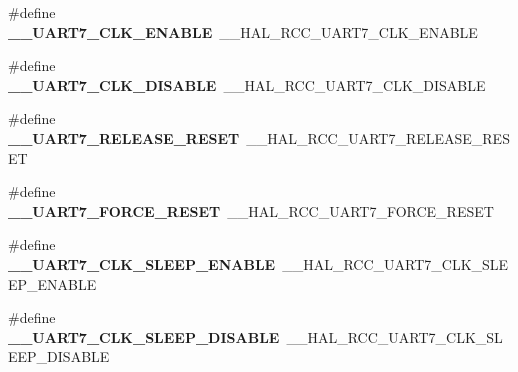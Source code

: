 \begin{DoxyCompactItemize}
\item 
\#define {\bfseries \+\_\+\+\_\+\+U\+A\+R\+T7\+\_\+\+C\+L\+K\+\_\+\+E\+N\+A\+B\+LE}~\+\_\+\+\_\+\+H\+A\+L\+\_\+\+R\+C\+C\+\_\+\+U\+A\+R\+T7\+\_\+\+C\+L\+K\+\_\+\+E\+N\+A\+B\+LE\hypertarget{group___h_a_l___r_c_c___aliased_ga7bb431add3abe23b0fdc920d818b478a}{}\label{group___h_a_l___r_c_c___aliased_ga7bb431add3abe23b0fdc920d818b478a}

\item 
\#define {\bfseries \+\_\+\+\_\+\+U\+A\+R\+T7\+\_\+\+C\+L\+K\+\_\+\+D\+I\+S\+A\+B\+LE}~\+\_\+\+\_\+\+H\+A\+L\+\_\+\+R\+C\+C\+\_\+\+U\+A\+R\+T7\+\_\+\+C\+L\+K\+\_\+\+D\+I\+S\+A\+B\+LE\hypertarget{group___h_a_l___r_c_c___aliased_gac296bb1fe20a4be61a6572c11021d61d}{}\label{group___h_a_l___r_c_c___aliased_gac296bb1fe20a4be61a6572c11021d61d}

\item 
\#define {\bfseries \+\_\+\+\_\+\+U\+A\+R\+T7\+\_\+\+R\+E\+L\+E\+A\+S\+E\+\_\+\+R\+E\+S\+ET}~\+\_\+\+\_\+\+H\+A\+L\+\_\+\+R\+C\+C\+\_\+\+U\+A\+R\+T7\+\_\+\+R\+E\+L\+E\+A\+S\+E\+\_\+\+R\+E\+S\+ET\hypertarget{group___h_a_l___r_c_c___aliased_ga5ba5a490c4e274abe50505d7458ee505}{}\label{group___h_a_l___r_c_c___aliased_ga5ba5a490c4e274abe50505d7458ee505}

\item 
\#define {\bfseries \+\_\+\+\_\+\+U\+A\+R\+T7\+\_\+\+F\+O\+R\+C\+E\+\_\+\+R\+E\+S\+ET}~\+\_\+\+\_\+\+H\+A\+L\+\_\+\+R\+C\+C\+\_\+\+U\+A\+R\+T7\+\_\+\+F\+O\+R\+C\+E\+\_\+\+R\+E\+S\+ET\hypertarget{group___h_a_l___r_c_c___aliased_gaaf86ef9f6097817a19c83e97285857ba}{}\label{group___h_a_l___r_c_c___aliased_gaaf86ef9f6097817a19c83e97285857ba}

\item 
\#define {\bfseries \+\_\+\+\_\+\+U\+A\+R\+T7\+\_\+\+C\+L\+K\+\_\+\+S\+L\+E\+E\+P\+\_\+\+E\+N\+A\+B\+LE}~\+\_\+\+\_\+\+H\+A\+L\+\_\+\+R\+C\+C\+\_\+\+U\+A\+R\+T7\+\_\+\+C\+L\+K\+\_\+\+S\+L\+E\+E\+P\+\_\+\+E\+N\+A\+B\+LE\hypertarget{group___h_a_l___r_c_c___aliased_ga947a94806fd8c9b1a322dccf17e05e4a}{}\label{group___h_a_l___r_c_c___aliased_ga947a94806fd8c9b1a322dccf17e05e4a}

\item 
\#define {\bfseries \+\_\+\+\_\+\+U\+A\+R\+T7\+\_\+\+C\+L\+K\+\_\+\+S\+L\+E\+E\+P\+\_\+\+D\+I\+S\+A\+B\+LE}~\+\_\+\+\_\+\+H\+A\+L\+\_\+\+R\+C\+C\+\_\+\+U\+A\+R\+T7\+\_\+\+C\+L\+K\+\_\+\+S\+L\+E\+E\+P\+\_\+\+D\+I\+S\+A\+B\+LE\hypertarget{group___h_a_l___r_c_c___aliased_ga8bef143f6c75c16d0bfe0e242eb798cb}{}\label{group___h_a_l___r_c_c___aliased_ga8bef143f6c75c16d0bfe0e242eb798cb}


\end{DoxyCompactItemize}
